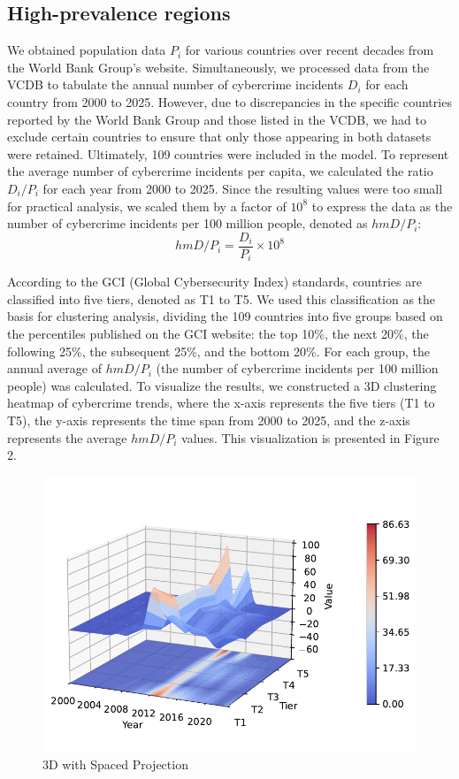 \subsection{High-prevalence regions}\label{subsec:high-prevalence-regions} %
	We obtained population data $P_i$ for various countries over recent decades from the World Bank Group's website\cite{population}.
	Simultaneously, we processed data from the VCDB to tabulate the annual number of cybercrime incidents $D_i$ for each country from 2000 to 2025.
	However, due to discrepancies in the specific countries reported by the World Bank Group and those listed in the VCDB,
	we had to exclude certain countries to ensure that only those appearing in both datasets were retained.
	Ultimately, 109 countries were included in the model.
	To represent the average number of cybercrime incidents per capita,
	we calculated the ratio $D_i/P_i$ for each year from 2000 to 2025.
	Since the resulting values were too small for practical analysis,
	we scaled them by a factor of $10^{8}$ to express the data as the number of cybercrime incidents per 100 million people,
	denoted as $hmD/P_i$:
	\[ hmD/P_i = \frac{D_i}{P_i} \times 10^{8} \]

	According to the GCI (Global Cybersecurity Index) standards, countries are classified into five tiers, denoted as T1 to T5.
	We used this classification as the basis for clustering analysis,
	dividing the 109 countries into five groups based on the percentiles published on the GCI website:
	the top 10\%, the next 20\%, the following 25\%, the subsequent 25\%, and the bottom 20\%.
	For each group, the annual average of $hmD/P_i$ (the number of cybercrime incidents per 100 million people) was calculated.
	To visualize the results, we constructed a 3D clustering heatmap of cybercrime trends,
	where the x-axis represents the five tiers (T1 to T5),
	the y-axis represents the time span from 2000 to 2025,
	and the z-axis represents the average $hmD/P_i$ values.
	This visualization is presented in Figure 2.
	\begin{figure}[htbp]
		\centering
		\includegraphics[width=0.8\linewidth]{./rsrc/3D_with_Spaced_Projection}
		\caption{3D with Spaced Projection}\label{fig:3D_with_Spaced_Projection}
	\end{figure}

